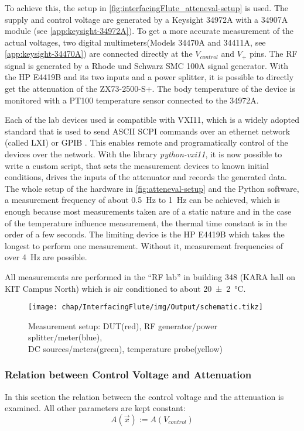To achieve this, the setup in \autoref{fig:interfacingFlute_atteneval-setup} is used.
The supply and control voltage are generated by a Keysight 34972A with a 34907A module (see \autoref{app:keysight-34972A}).
To get a more accurate measurement of the actual voltages, two digital multimeters(Models 34470A and 34411A, see \autoref{app:keysight-34470A}) are connected directly at the $V_{control}$ and $V_+$ pins.
The RF signal is generated by a Rhode und Schwarz SMC 100A signal generator.
With the HP E4419B and its two inputs and a power splitter, it is possible to directly get the attenuation of the ZX73-2500-S+.
The body temperature of the device is monitored with a PT100 temperature sensor connected to the 34972A.

Each of the lab devices used is compatible with VXI11, which is a widely adopted standard that is used to send ASCII SCPI commands over an ethernet network (called LXI) or GPIB \cite{lxi2021}.
This enables remote and programatically control of the devices over the network.
With the library \textit{python-vxi11}, it is now possible to write a custom script, that sets the measurement devices to known initial conditions, drives the inputs of the attenuator and records the generated data.
The whole setup of the hardware in \autoref{fig:atteneval-setup} and the Python software, a measurement frequency of about \SI{0.5}{\Hz} to \SI{1}{\Hz} can be achieved, which is enough because most measurements taken are of a static nature and in the case of the temperature influence measurement, the thermal time constant is in the order of a few seconds.
The limiting device is the HP E4419B which takes the longest to perform one measurement. Without it, measurement frequencies of over \SI{4}{\Hz} are possible.

All measurements are performed in the ``RF lab'' in building 348 (KARA hall on KIT Campus North) which is air conditioned to about \SI{20(2)}{\celsius}.

\begin{figure}[tb]
	\centering
	\texttt{[image: chap/InterfacingFlute/img/Output/schematic.tikz]}
	\caption{Measurement setup: DUT(red), RF generator/power splitter/meter(blue),\\ DC sources/meters(green), temperature probe(yellow)}
	\label{fig:interfacingFlute_atteneval-setup}
\end{figure}

\subsubsection{Relation between Control Voltage and Attenuation}
In this section the relation between the control voltage and the attenuation is examined. All other parameters are kept constant:
\begin{equation}
A(\vec{x}) := A(V_{control})
\end{equation}

